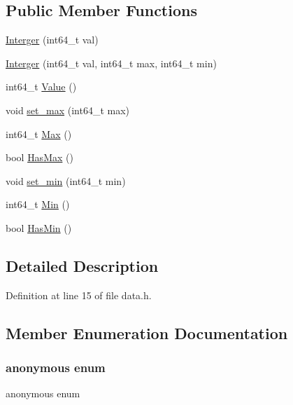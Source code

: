 \subsection*{Public Member Functions}
\begin{DoxyCompactItemize}
\item 
\mbox{\hyperlink{classnabla_1_1data_1_1_interger_a953a543e5b10052bd7bddc175a41637b}{Interger}} (int64\+\_\+t val)
\item 
\mbox{\hyperlink{classnabla_1_1data_1_1_interger_a0ea5712a1f73a0c12e1427eb890f620e}{Interger}} (int64\+\_\+t val, int64\+\_\+t max, int64\+\_\+t min)
\item 
int64\+\_\+t \mbox{\hyperlink{classnabla_1_1data_1_1_interger_a3bbd8bd6b1e1815820e91624ec3e8b15}{Value}} ()
\item 
void \mbox{\hyperlink{classnabla_1_1data_1_1_interger_a2966879b4333e9ff34458a07b658cc94}{set\+\_\+max}} (int64\+\_\+t max)
\item 
int64\+\_\+t \mbox{\hyperlink{classnabla_1_1data_1_1_interger_aea133995f3dff9968a6043329f66363e}{Max}} ()
\item 
bool \mbox{\hyperlink{classnabla_1_1data_1_1_interger_a626cb9b056389503fa1dff01c02ddb9f}{Has\+Max}} ()
\item 
void \mbox{\hyperlink{classnabla_1_1data_1_1_interger_a6a8f7127f186c70e6ef58f91814c43e4}{set\+\_\+min}} (int64\+\_\+t min)
\item 
int64\+\_\+t \mbox{\hyperlink{classnabla_1_1data_1_1_interger_a45433ae8b5f064f9acd1667a0f9dbdc0}{Min}} ()
\item 
bool \mbox{\hyperlink{classnabla_1_1data_1_1_interger_a0c41372880c86fc38f8a38f425f4153d}{Has\+Min}} ()
\end{DoxyCompactItemize}


\subsection{Detailed Description}


Definition at line 15 of file data.\+h.



\subsection{Member Enumeration Documentation}
\mbox{\label{classnabla_1_1data_1_1_interger_aa460020920651f32af7c721750062aae}} 
\subsubsection{\texorpdfstring{anonymous enum}{anonymous enum}}
{\footnotesize\ttfamily anonymous enum}


